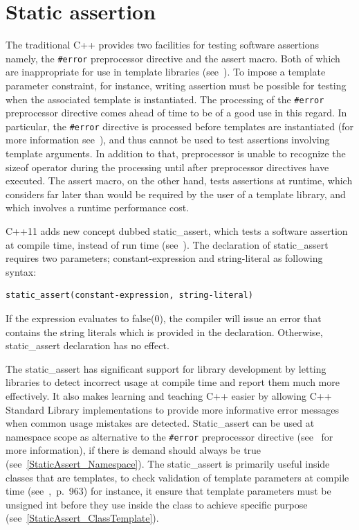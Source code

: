 \documentclass[11pt]{report}
\begin{document}
\section{Static assertion}
\label{section: Static assertion}
The traditional C++ provides two facilities for testing software assertions namely, the \texttt{\#error} preprocessor directive and the assert macro. Both of which are inappropriate for use in template libraries (see~\cite{Stroustrup:2012:Cpp11}). To impose a template parameter constraint, for instance, writing assertion must be possible for testing when the associated template is instantiated. The processing of the \texttt{\#error} preprocessor directive comes ahead of time to be of a good use in this regard. In particular, the \texttt{\#error} directive is processed before templates are instantiated (for more information see~\cite{Stroustrup:2012:Cpp11}), and thus cannot be used to test assertions involving template arguments. In addition to that, preprocessor is unable to recognize the sizeof operator during the processing until after preprocessor directives have executed. The assert macro, on the other hand, tests assertions at runtime, which considers far later than would be required by the user of a template library, and which involves a runtime performance cost.

C++11 adds new concept dubbed static\_assert, which tests a software assertion at compile time, instead of run time (see~\cite{MSDN:2012:CppModern}). The declaration of static\_assert requires two parameters; constant-expression and string-literal as following syntax:
\begin{lstlisting}
static_assert(constant-expression, string-literal)
\end{lstlisting}
If the expression evaluates to false(0), the compiler will issue an error that contains the string literals which is provided in the declaration. Otherwise, static\_assert declaration has no effect.

The static\_assert has significant support for library development by letting libraries to detect incorrect usage at compile time and report them much more effectively. It also makes learning and teaching C++ easier by allowing C++ Standard Library implementations to provide more informative error messages when common usage mistakes are detected. Static\_assert can be used at namespace scope as alternative to the \texttt{\#error} preprocessor directive (see~\cite{MSDN:2012:CppModern} for more information), if there is demand should always be true (see~\ref{StaticAssert_Namespace}). The static\_assert is primarily useful inside classes that are templates, to check validation of template parameters at compile time (see~\cite{Deitel:2012:CPP},~p.~963) for instance, it ensure that template parameters must be unsigned int before they use inside the class  to achieve specific purpose (see~\ref{StaticAssert_ClassTemplate}).
\end{document}
